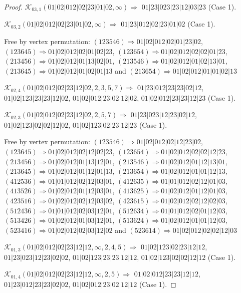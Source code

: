 \documentclass[12pt]{article}
\theoremstyle{plain}
\theoremstyle{definition}
\theoremstyle{remark}
\newcommand{\fancy}[1]{\mathcal{#1}}
\def\K{\fancy{K}}
\begin{document}
\begin{proof}
	$\K_{03,1}(01|02|012|02|23|01|02,\infty)\Rightarrow $ $01|23|023|23|12|03|23$ (Case 1).
	
	$\K_{03,2}(01|02|012|02|23|01|02,\infty)\Rightarrow $ $01|23|012|02|23|01|02$ (Case 1).
	
	
	
	Free by vertex permutation: $(1 2 3 5 4 6)\Rightarrow 01|02|012|02|01|23|02$, $(1 2 3 6 4 5)\Rightarrow 01|02|012|02|01|02|23$, $(1 2 3 6 5 4)\Rightarrow 01|02|012|02|02|01|23$, $(2 1 3 4 5 6)\Rightarrow 01|02|012|01|13|02|01$, $(2 1 3 5 4 6)\Rightarrow 01|02|012|01|02|13|01$, $(2 1 3 6 4 5)\Rightarrow 01|02|012|01|02|01|13$ and $(2 1 3 6 5 4)\Rightarrow 01|02|012|01|01|02|13$
	
	
	
	\bigskip
	
	$\K_{02,4}(01|02|012|02|23|12|02,2, 3, 5, 7)\Rightarrow $ $01|23|012|23|23|02|12$, $01|02|123|23|23|12|02$, $01|02|012|23|02|12|02$, $01|02|012|23|23|12|23$ (Case 1).
	
	$\K_{02,3}(01|02|012|02|23|12|02,2, 5, 7)\Rightarrow $ $01|23|023|12|23|02|12$, $01|02|123|02|02|12|02$, $01|02|123|02|23|12|23$ (Case 1).
	
	
	
	Free by vertex permutation: $(1 2 3 5 4 6)\Rightarrow 01|02|012|02|12|23|02$, $(1 2 3 6 4 5)\Rightarrow 01|02|012|02|12|02|23$, $(1 2 3 6 5 4)\Rightarrow 01|02|012|02|02|12|23$, $(2 1 3 4 5 6)\Rightarrow 01|02|012|01|13|12|01$, $(2 1 3 5 4 6)\Rightarrow 01|02|012|01|12|13|01$, $(2 1 3 6 4 5)\Rightarrow 01|02|012|01|12|01|13$, $(2 1 3 6 5 4)\Rightarrow 01|02|012|01|01|12|13$, $(4 1 2 5 3 6)\Rightarrow 01|01|012|02|12|03|01$, $(4 1 2 6 3 5)\Rightarrow 01|01|012|02|12|01|03$, $(4 1 3 5 2 6)\Rightarrow 01|02|012|01|12|03|01$, $(4 1 3 6 2 5)\Rightarrow 01|02|012|01|12|01|03$, $(4 2 3 5 1 6)\Rightarrow 01|02|012|02|12|03|02$, $(4 2 3 6 1 5)\Rightarrow 01|02|012|02|12|02|03$, $(5 1 2 4 3 6)\Rightarrow 01|01|012|02|03|12|01$, $(5 1 2 6 3 4)\Rightarrow 01|01|012|02|01|12|03$, $(5 1 3 4 2 6)\Rightarrow 01|02|012|01|03|12|01$, $(5 1 3 6 2 4)\Rightarrow 01|02|012|01|01|12|03$, $(5 2 3 4 1 6)\Rightarrow 01|02|012|02|03|12|02$ and $(5 2 3 6 1 4)\Rightarrow 01|02|012|02|02|12|03$
	
	
	
	\bigskip
	
	$\K_{01,3}(01|02|012|02|23|12|12,\infty,2, 4, 5)\Rightarrow $ $01|02|123|02|23|12|12$, $01|23|023|12|23|02|02$, $01|02|123|23|23|12|12$, $01|02|123|02|02|12|12$ (Case 1).
	
	$\K_{01,4}(01|02|012|02|23|12|12,\infty,2, 5)\Rightarrow $ $01|02|012|23|23|12|12$, $01|23|012|23|23|02|02$, $01|02|012|23|02|12|12$ (Case 1).
	

\end{proof}
\end{document}
